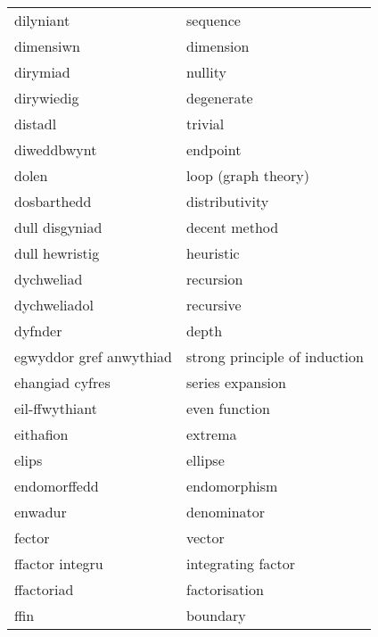 \begin{supertabular}{p{0.22\textwidth}p{0.22\textwidth}}
                       dilyniant &                          sequence \\
                       dimensiwn &                         dimension \\
                        dirymiad &                           nullity \\
                      dirywiedig &                        degenerate \\
                         distadl &                           trivial \\
                     diweddbwynt &                          endpoint \\
                           dolen &               loop (graph theory) \\
                     dosbarthedd &                    distributivity \\
                  dull disgyniad &                     decent method \\
                  dull hewristig &                         heuristic \\
                      dychweliad &                         recursion \\
                    dychweliadol &                         recursive \\
                         dyfnder &                             depth \\
         egwyddor gref anwythiad &     strong principle of induction \\
                 ehangiad cyfres &                  series expansion \\
                  eil-ffwythiant &                     even function \\
                       eithafion &                           extrema \\
                           elips &                           ellipse \\
                    endomorffedd &                      endomorphism \\
                         enwadur &                       denominator \\
                          fector &                            vector \\
                 ffactor integru &                integrating factor \\
                      ffactoriad &                     factorisation \\
                            ffin &                          boundary \\

\end{supertabular}
